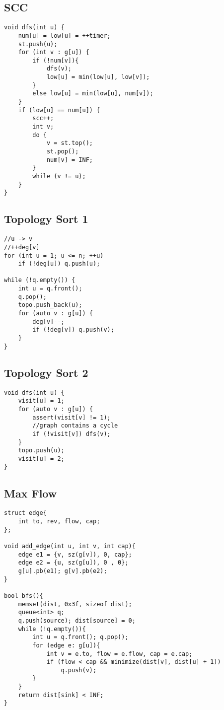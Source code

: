 \documentclass[11pt,a4paper]{article}
\begin{document}
\begin{multicols*}{2}
\subsection{SCC}
\begin{lstlisting}
void dfs(int u) {
    num[u] = low[u] = ++timer;
    st.push(u);
    for (int v : g[u]) {
        if (!num[v]){
            dfs(v);
            low[u] = min(low[u], low[v]);
        }
        else low[u] = min(low[u], num[v]);
    }
    if (low[u] == num[u]) {
        scc++;
        int v;
        do {
            v = st.top();
            st.pop();
            num[v] = INF;
        }
        while (v != u);
    }
}
\end{lstlisting}

\subsection{Topology Sort 1}
\begin{lstlisting}
//u -> v
//++deg[v]
for (int u = 1; u <= n; ++u)
    if (!deg[u]) q.push(u);

while (!q.empty()) {
    int u = q.front();
    q.pop();
    topo.push_back(u);
    for (auto v : g[u]) {
        deg[v]--;
        if (!deg[v]) q.push(v);
    }
}
\end{lstlisting}

\subsection{Topology Sort 2}
\begin{lstlisting}
void dfs(int u) {
    visit[u] = 1;
    for (auto v : g[u]) {
        assert(visit[v] != 1); 
        //graph contains a cycle
        if (!visit[v]) dfs(v);
    }
    topo.push(u);
    visit[u] = 2;
}
\end{lstlisting}

\subsection{Max Flow}
\begin{lstlisting}
struct edge{
	int to, rev, flow, cap;
};

void add_edge(int u, int v, int cap){
	edge e1 = {v, sz(g[v]), 0, cap};
    edge e2 = {u, sz(g[u]), 0 , 0};
    g[u].pb(e1); g[v].pb(e2);
}

bool bfs(){
	memset(dist, 0x3f, sizeof dist);
	queue<int> q;
	q.push(source); dist[source] = 0;
	while (!q.empty()){
		int u = q.front(); q.pop();
		for (edge e: g[u]){
			int v = e.to, flow = e.flow, cap = e.cap;
			if (flow < cap && minimize(dist[v], dist[u] + 1))
				q.push(v);
		}
	}
	return dist[sink] < INF;
}


\end{lstlisting}
\end{multicols*}
\end{document}

